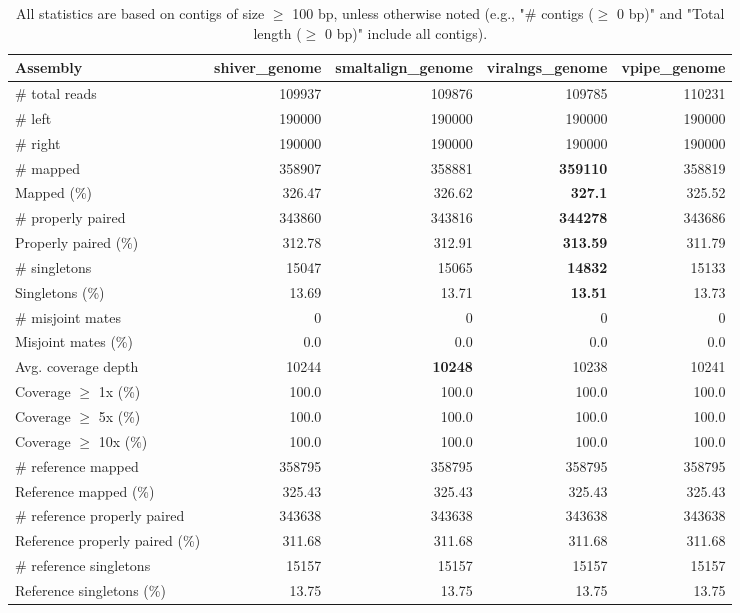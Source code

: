 \documentclass[12pt,a4paper]{article}
\begin{document}
\begin{table}[ht]
\begin{center}
\caption{All statistics are based on contigs of size $\geq$ 100 bp, unless otherwise noted (e.g., "\# contigs ($\geq$ 0 bp)" and "Total length ($\geq$ 0 bp)" include all contigs).}
\begin{tabular}{|l*{4}{|r}|}
\hline
Assembly & shiver\_genome & smaltalign\_genome & viralngs\_genome & vpipe\_genome \\ \hline
\# total reads & 109937 & 109876 & 109785 & 110231 \\ \hline
\# left & 190000 & 190000 & 190000 & 190000 \\ \hline
\# right & 190000 & 190000 & 190000 & 190000 \\ \hline
\# mapped & 358907 & 358881 & {\bf 359110} & 358819 \\ \hline
Mapped (\%) & 326.47 & 326.62 & {\bf 327.1} & 325.52 \\ \hline
\# properly paired & 343860 & 343816 & {\bf 344278} & 343686 \\ \hline
Properly paired (\%) & 312.78 & 312.91 & {\bf 313.59} & 311.79 \\ \hline
\# singletons & 15047 & 15065 & {\bf 14832} & 15133 \\ \hline
Singletons (\%) & 13.69 & 13.71 & {\bf 13.51} & 13.73 \\ \hline
\# misjoint mates & 0 & 0 & 0 & 0 \\ \hline
Misjoint mates (\%) & 0.0 & 0.0 & 0.0 & 0.0 \\ \hline
Avg. coverage depth & 10244 & {\bf 10248} & 10238 & 10241 \\ \hline
Coverage $\geq$ 1x (\%) & 100.0 & 100.0 & 100.0 & 100.0 \\ \hline
Coverage $\geq$ 5x (\%) & 100.0 & 100.0 & 100.0 & 100.0 \\ \hline
Coverage $\geq$ 10x (\%) & 100.0 & 100.0 & 100.0 & 100.0 \\ \hline
\# reference mapped & 358795 & 358795 & 358795 & 358795 \\ \hline
Reference mapped (\%) & 325.43 & 325.43 & 325.43 & 325.43 \\ \hline
\# reference properly paired & 343638 & 343638 & 343638 & 343638 \\ \hline
Reference properly paired (\%) & 311.68 & 311.68 & 311.68 & 311.68 \\ \hline
\# reference singletons & 15157 & 15157 & 15157 & 15157 \\ \hline
Reference singletons (\%) & 13.75 & 13.75 & 13.75 & 13.75 \\ \hline

\end{tabular}
\end{center}
\end{table}
\end{document}
